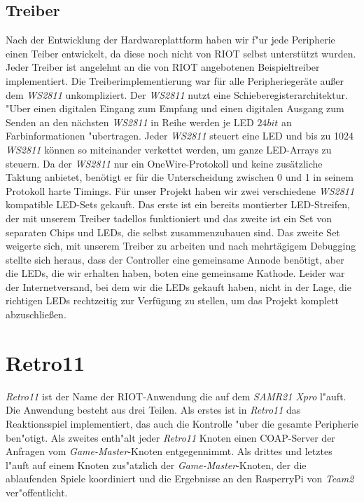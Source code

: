 \documentclass[a4paper]{article}
\begin{document}
  \subsection{Treiber}
    \label{sec:hardware_driver}
    Nach der Entwicklung der Hardwareplattform haben wir f"ur jede Peripherie
    einen Teiber entwickelt, da diese noch nicht von RIOT selbst unterstützt
    wurden. Jeder Treiber ist angelehnt an die von RIOT angebotenen
    Beispieltreiber implementiert. Die Treiberimplementierung war für alle
    Peripheriegeräte außer dem \textit{WS2811} unkompliziert. Der
    \textit{WS2811} nutzt eine Schieberegisterarchitektur.  "Uber einen
    digitalen Eingang zum Empfang und einen digitalen Ausgang zum Senden an den
    nächsten \textit{WS2811} in Reihe werden je LED \( 24 bit\) an
    Farbinformationen "ubertragen.  Jeder \textit{WS2811} steuert eine LED und
    bis zu 1024 \textit{WS2811} können so miteinander verkettet werden, um ganze
    LED-Arrays zu steuern. Da der \textit{WS2811} nur ein OneWire-Protokoll und keine
    zusätzliche Taktung anbietet, benötigt er für die Unterscheidung zwischen 0
    und 1 in seinem Protokoll harte Timings. Für unser Projekt haben wir zwei
    verschiedene \textit{WS2811} kompatible LED-Sets gekauft. Das erste ist ein
    bereits montierter LED-Streifen, der mit unserem Treiber tadellos
    funktioniert und das zweite ist ein Set von separaten Chips und LEDs, die
    selbst zusammenzubauen sind. Das zweite Set weigerte sich, mit unserem
    Treiber zu arbeiten und nach mehrtägigem Debugging stellte sich heraus,
    dass der Controller eine gemeinsame Annode benötigt, aber die LEDs, die wir
    erhalten haben, boten eine gemeinsame Kathode.  Leider war der
    Internetversand, bei dem wir die LEDs gekauft haben, nicht in der Lage, die
    richtigen LEDs rechtzeitig zur Verfügung zu stellen, um das Projekt
    komplett abzuschließen.

\section{Retro11}
  \label{sec:retro11}
  \textit{Retro11} ist der Name der RIOT-Anwendung die auf dem \textit{SAMR21
  Xpro} l"auft. Die Anwendung besteht aus drei Teilen. Als erstes ist in
  \textit{Retro11} das Reaktionsspiel implementiert, das auch die Kontrolle
  "uber die gesamte Peripherie ben"otigt. Als zweites enth"alt jeder
  \textit{Retro11} Knoten einen COAP-Server der Anfragen vom
  \textit{Game-Master}-Knoten entgegennimmt. Als drittes und letztes l"auft auf
  einem Knoten zus"atzlich der \textit{Game-Master}-Knoten, der die ablaufenden
  Spiele koordiniert und die Ergebnisse an den RasperryPi von \textit{Team2}
  ver"offentlicht.
\end{document}
